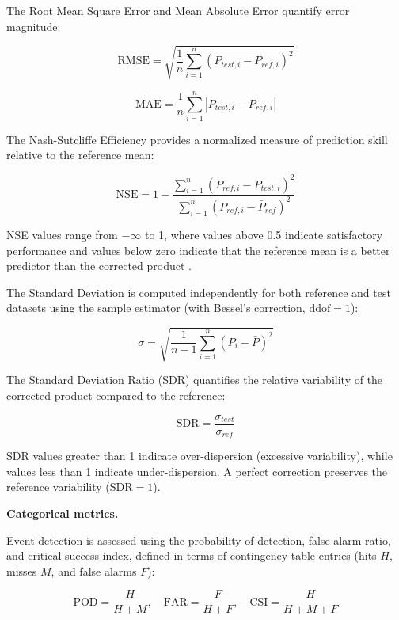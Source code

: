 \documentclass[11pt,a4paper]{article}
\begin{document}
The Root Mean Square Error and Mean Absolute Error quantify error
magnitude:

\begin{equation}\text{RMSE} = \sqrt{\frac{1}{n} \sum_{i=1}^{n} (P_{test,i} - P_{ref,i})^2}\end{equation}

\begin{equation}\text{MAE} = \frac{1}{n} \sum_{i=1}^{n} |P_{test,i} - P_{ref,i}|\end{equation}

The Nash-Sutcliffe Efficiency provides a normalized measure of
prediction skill relative to the reference mean:

\begin{equation}\text{NSE} = 1 - \frac{\sum_{i=1}^{n}(P_{ref,i} - P_{test,i})^2}{\sum_{i=1}^{n}(P_{ref,i} - \bar{P}_{ref})^2}\end{equation}

NSE values range from \(-\infty\) to 1, where values above 0.5 indicate
satisfactory performance and values below zero indicate that the
reference mean is a better predictor than the corrected product
\cite{ref28,ref29}.

The Standard Deviation is computed independently for both reference and
test datasets using the sample estimator (with Bessel's correction,
\(\text{ddof} = 1\)):

\begin{equation}\sigma = \sqrt{\frac{1}{n-1} \sum_{i=1}^{n} (P_i - \bar{P})^2}\end{equation}

The Standard Deviation Ratio (SDR) quantifies the relative variability
of the corrected product compared to the reference:

\begin{equation}\text{SDR} = \frac{\sigma_{test}}{\sigma_{ref}}\end{equation}

SDR values greater than 1 indicate over-dispersion (excessive
variability), while values less than 1 indicate under-dispersion. A
perfect correction preserves the reference variability
(\(\text{SDR} = 1\)).

\textbf{Categorical metrics.}

Event detection is assessed using the probability of detection, false
alarm ratio, and critical success index, defined in terms of contingency
table entries (hits \(H\), misses \(M\), and false alarms \(F\)):

\begin{equation}\text{POD} = \frac{H}{H + M}, \quad \text{FAR} = \frac{F}{H + F}, \quad \text{CSI} = \frac{H}{H + M + F}\end{equation}
\end{document}
